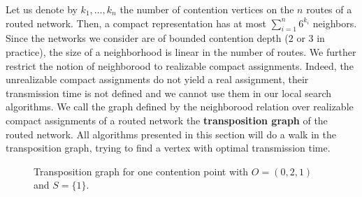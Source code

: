  Let us denote by $k_1,\ldots,k_n$ the number of contention vertices on the $n$ routes of 
 a routed network. Then, a compact representation has at most $\sum_{i=1}^n 6^{k_i}$ neighbors. Since the networks we consider are of bounded contention depth ($2$ or $3$ in practice), the size of a neighborhood is linear in the number of routes.  We further restrict the notion of neighborood to realizable compact assignments. Indeed, the unrealizable compact assignments do not yield a real assignment, their transmission time is not defined and we cannot use them in our local search algorithms. We call the graph defined by the neighborood relation over realizable compact assignments of a routed network the \textbf{transposition graph} of the routed network. 
  All algorithms presented in this section will do a walk in the transposition graph, trying to find a vertex with optimal
  transmission time. 


\begin{figure}
\begin{center}


 \caption{Transposition graph for one contention point with $O = (0,2,1)$ and $S = \{1\}$.}

\label{fig:partialtree}
\end{center}
\end{figure}

